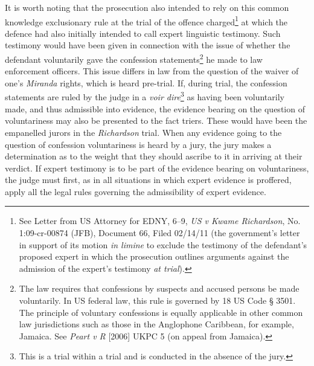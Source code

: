 \documentclass[output=paper,colorlinks,citecolor=brown]{langscibook}
\begin{document}
It is worth noting that the prosecution also intended to rely on this common knowledge exclusionary rule at the trial of the offence charged\footnote{See Letter from US Attorney for EDNY, 6--9, \emph{US v Kwame Richardson}, No. 1:09-cr-00874 (JFB), Document 66, Filed 02/14/11 (the government’s letter in support of its motion \emph{in limine} to exclude the testimony of the defendant’s proposed expert in which the prosecution outlines arguments against the admission of the expert’s testimony \emph{at trial}).} at which the defence had also initially intended to call expert linguistic testimony. Such testimony would have been given in connection with the issue of whether the defendant voluntarily gave the confession statements\footnote{The law requires that confessions by suspects and accused persons be made voluntarily.  In US federal law, this rule is governed by 18 US Code § 3501.  The principle of voluntary confessions is equally applicable in other common law jurisdictions such as those in the Anglophone Caribbean, for example, Jamaica. See \emph{Peart v R }[2006] UKPC 5 (on appeal from Jamaica).} he made to law enforcement officers. This issue differs in law from the question of the waiver of one’s \emph{Miranda} rights, which is heard pre-trial. If, during trial, the confession statements are ruled by the judge in a \emph{voir dire}\footnote{This is a trial within a trial and is conducted in the absence of the jury.} as having been voluntarily made, and thus admissible into evidence, the evidence bearing on the question of voluntariness may also be presented to the fact triers. These would have been the empanelled jurors in the \textit{Richardson} trial. When any evidence going to the question of confession voluntariness is heard by a jury, the jury makes a determination as to the weight that they should ascribe to it in arriving at their verdict.  If expert testimony is to be part of the evidence bearing on voluntariness, the judge must first, as in all situations in which expert evidence is proffered, apply all the legal rules governing the admissibility of expert evidence. 
\end{document}
